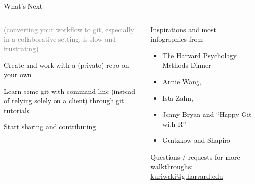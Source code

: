 \documentclass[ignorenonframetext, 10pt, aspectratio=169]{beamer}
\begin{document}
\begin{frame}{What's Next}



\begin{columns}[T]
\begin{column}{0.5\textwidth}

\textcolor{gray}{(converting your workflow to git, especially in a collaborative setting, is slow and frustrating)}

\smallskip

\begin{wideenumerate}
\item Create and work with a (private) repo on your own
\item Learn some git with command-line (instead of relying solely on a client) through git tutorials
\item Start sharing and contributing
\end{wideenumerate}

\end{column}
\begin{column}{0.5\textwidth}
Inspirations and most infographics from

\begin{itemize}
\item The Harvard Psychology Methods Dinner
\item Annie Wang,
\item Ista Zahn,
\item Jenny Bryan and ``Happy Git with R''
\item Gentzkow and Shapiro
\end{itemize}
\bigskip
Questions / requests for more walkthroughs: \url{kuriwaki@g.harvard.edu}
\end{column}
\end{columns}

\end{frame}
\end{document}
